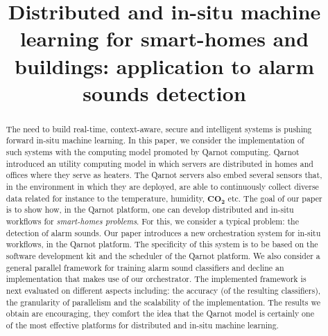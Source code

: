 \documentclass[10pt, conference, compsocconf]{IEEEtran}
\begin{document}
%
\title{Distributed and in-situ machine learning for smart-homes and buildings: application to alarm sounds detection}



\author{
\and
{}
\and
{}
}

\maketitle

\setlength{\abovecaptionskip}{0pt}
\setlength{\belowcaptionskip}{0pt}
\setlength{\intextsep}{1pt}
\setlength{\dbltextfloatsep}{3pt}
\setlength{\textfloatsep}{3pt}


\begin{abstract}
The need to build real-time, context-aware, secure and intelligent systems is pushing forward in-situ machine learning. 
In this paper, we consider the implementation of such systems with the computing model promoted by 
Qarnot computing. Qarnot introduced an utility computing model in which servers are distributed in homes and offices where they
serve as heaters. The Qarnot servers also embed several sensors that, in the environment in which they are deployed, are able to continuously 
collect diverse data related for instance to the temperature, humidity, $\mathbf{CO_2}$ etc. The goal of our paper is to show how, 
in the Qarnot platform, one can develop distributed and in-situ workflows for {\it smart-homes problems}. For this, 
we consider a typical problem: the detection of alarm sounds. Our paper introduces a new orchestration system for in-situ workflows, 
in the Qarnot platform. 
The specificity of this system is to be based on the software development kit and the scheduler of the Qarnot platform.
We also consider a general parallel framework for training alarm sound classifiers and decline an implementation that makes 
use of our orchestrator.
The implemented framework is next evaluated on different aspects including: the accuracy (of the resulting classifiers), the granularity of parallelism and the scalability of the implementation. The results we obtain are encouraging, they comfort the idea that the Qarnot model is certainly one of the most effective platforms for distributed and in-situ machine learning. 
\end{abstract}
\end{document}
